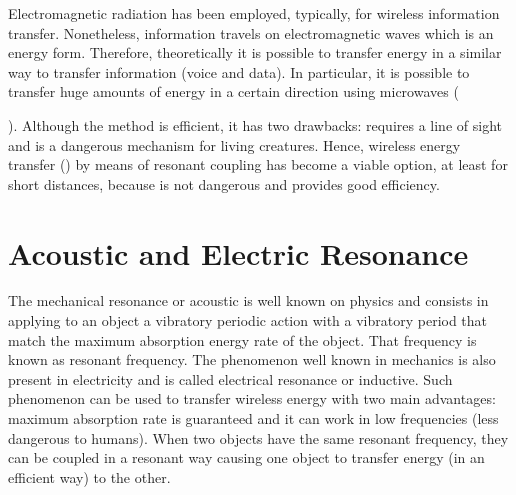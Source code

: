 \documentclass{intech}
\begin{document}
Electromagnetic radiation has been employed, typically, for wireless information transfer. Nonetheless, information travels on electromagnetic waves which is an energy form. Therefore, theoretically it is possible to transfer energy in a similar way to transfer information (voice and data). In particular, it is possible to transfer huge amounts of energy in a certain direction using microwaves ({\cite{RES22}). Although the method is efficient, it has two drawbacks: requires a line of sight and is a dangerous mechanism for living creatures. Hence, wireless energy transfer (\cite{RES1}) by means of resonant coupling has become a viable option, at least for short distances, because is not dangerous and provides good efficiency.




\section{Acoustic and Electric Resonance}

The mechanical resonance or acoustic is well known on physics and consists in applying to an object a vibratory periodic action with a vibratory period that match the maximum absorption energy rate of the object. That frequency is known as resonant frequency. The phenomenon well known in mechanics is also present in electricity and is called electrical resonance or inductive. Such phenomenon can be used to transfer wireless energy with two main advantages: maximum absorption rate is guaranteed and it can work in low frequencies (less dangerous to humans). When two objects have the same resonant frequency, they can be coupled in a resonant way causing one object to transfer energy (in an efficient way) to the other.

}
\end{document}
